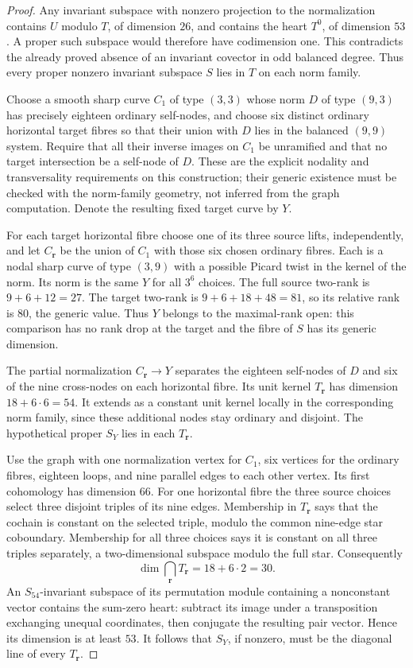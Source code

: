 \begin{proof}
Any invariant subspace with nonzero projection to the normalization
contains $U$ modulo $T$, of dimension $26$, and contains the heart
$T^0$, of dimension $53$. A proper such subspace would therefore
have codimension one. This contradicts the already proved absence
of an invariant covector in odd balanced degree. Thus every proper
nonzero invariant subspace $S$ lies in $T$ on each norm family.

Choose a smooth sharp curve $C_1$ of type $(3,3)$ whose norm
$D$ of type $(9,3)$ has precisely eighteen ordinary self-nodes,
and choose six distinct ordinary horizontal target fibres so that
their union with $D$ lies in the balanced $(9,9)$ system. Require
that all their inverse images on $C_1$ be unramified and that no
target intersection be a self-node of $D$. These are the explicit
nodality and transversality requirements on this construction;
their generic existence must be checked with the norm-family
geometry, not inferred from the graph computation.
Denote the resulting fixed target curve by $Y$.

For each target horizontal fibre choose one of its three source
lifts, independently, and let $C_{\mathbf r}$ be the union of
$C_1$ with those six chosen ordinary fibres. Each is a nodal sharp
curve of type $(3,9)$ with a possible Picard twist in the kernel
of the norm. Its norm is the same $Y$ for all $3^6$ choices.
The full source two-rank is $9+6+12=27$. The target two-rank is
$9+6+18+48=81$, so its relative rank is $80$, the generic value.
Thus $Y$ belongs to the maximal-rank open: this comparison has no
rank drop at the target and the fibre of $S$ has its generic dimension.

The partial normalization $C_{\mathbf r}\to Y$ separates the
eighteen self-nodes of $D$ and six of the nine cross-nodes on each
horizontal fibre. Its unit kernel $T_{\mathbf r}$ has dimension
$18+6\cdot6=54$. It extends as a constant unit kernel locally in
the corresponding norm family, since these additional nodes stay
ordinary and disjoint. The hypothetical proper $S_Y$ lies in each
$T_{\mathbf r}$.

Use the graph with one normalization vertex for $C_1$, six vertices
for the ordinary fibres, eighteen loops, and nine parallel edges to
each other vertex. Its first cohomology has dimension $66$. For one
horizontal fibre the three source choices select three disjoint
triples of its nine edges. Membership in $T_{\mathbf r}$ says that
the cochain is constant on the selected triple, modulo the common
nine-edge star coboundary. Membership for all three choices says
it is constant on all three triples separately, a two-dimensional
subspace modulo the full star. Consequently
\[
             \dim\bigcap_{\mathbf r}T_{\mathbf r}
                        =18+6\cdot2=30.
\]
An $S_{54}$-invariant subspace of its permutation module containing
a nonconstant vector contains the sum-zero heart: subtract its
image under a transposition exchanging unequal coordinates, then
conjugate the resulting pair vector. Hence its dimension is at least
$53$. It follows that $S_Y$, if nonzero, must be the diagonal line
of every $T_{\mathbf r}$.


\end{proof}
